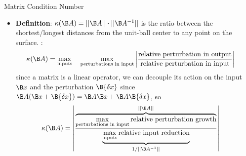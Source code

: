 \begin{frame}{Matrix Condition Number}


\begin{itemize}
\item {\bf Definition}: $\kappa(\B A) = ||\B A|| \cdot||\B A^{-1}||$ is the ratio between the shortest/longest distances from the unit-ball center to any point on the surface.
:
\begin{align*}
\kappa(\B A) &= \max_{\text{inputs}} \quad \max_{\text{perturbations in input}}\left|\frac{\text{relative perturbation in output}}{\text{relative perturbation in input}}\right| 
\end{align*}
since a matrix is a linear operator, we can decouple its action on
the input $\B x$ and the perturbation $\B{\delta x}$ since $\B A(\B x +\B{\delta x}) = \B A \B x + \B A \B{\delta x}$, so
\begin{align*}
\kappa(\B A) &= \left|\frac{\overbrace{\max_{\text{perturbations in input}}\text{relative perturbation growth}}^{||\B A||}}{\underbrace{\max_{\text{inputs}} \text{relative input reduction}}_{1/||\B A^{-1}||}}\right| 
\end{align*}
\end{itemize}
\end{frame}



